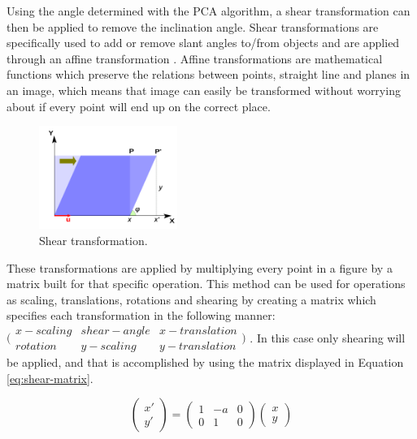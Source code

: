 Using the angle determined with the PCA algorithm, a shear transformation can then be applied to remove the inclination angle. Shear transformations are specifically used to add or remove slant angles to/from objects and are applied through an affine transformation \cite{berger1987geometry}. Affine transformations are mathematical functions which preserve the relations between points, straight line and planes in an image, which means that image can easily be transformed without worrying about if every point will end up on the correct place.


\begin{figure}[ht]
    \centering
    \includegraphics[width=0.4\textwidth]{plaatjes/shear}
    \caption{Shear transformation. \cite{shear-fig}}
    \label{fig:shear}
\end{figure}%

These transformations are applied by multiplying every point in a figure by a matrix built for that specific operation. This method can be used for operations as scaling, translations, rotations and shearing by creating a matrix which specifies each transformation in the following manner: 
$\bigl(
    \begin{smallmatrix}
        x-scaling & shear-angle & x-translation \\ 
        rotation & y-scaling & y-translation
    \end{smallmatrix} 
\bigr)$
. In this case only shearing will be applied, and that is accomplished by using the matrix displayed in Equation \ref{eq:shear-matrix}. 

\begin{equation}
    \begin{pmatrix}
        x' \\
        y'
    \end{pmatrix}
    =
    \begin{pmatrix}
        1 & -a & 0 \\
        0 & 1 & 0
    \end{pmatrix}
    \begin{pmatrix}
        x \\
        y
    \end{pmatrix}
    \label{eq:shear-matrix}
\end{equation}

